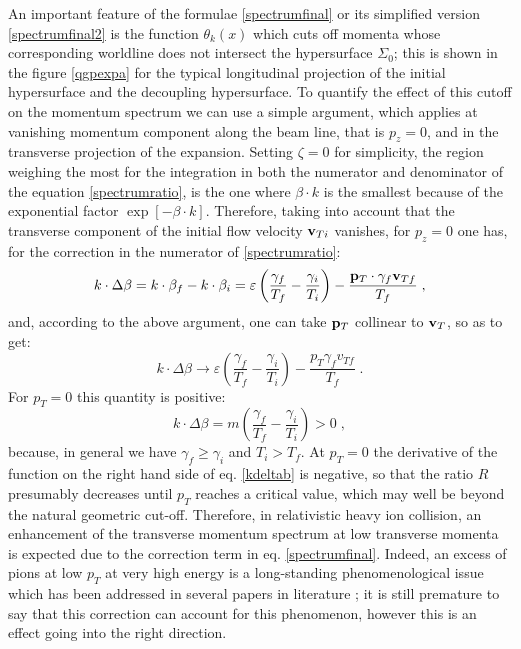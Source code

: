 \documentclass[prd,superscriptaddress,nofootinbib,notitlepage]{revtex4-1}
\newcommand{\be}{\begin{equation}}
\newcommand{\ee}{\end{equation}}
\begin{document}
An important feature of the formulae \eqref{spectrumfinal} or its simplified version \eqref{spectrumfinal2} is the function
$\theta_k(x)$ which cuts off momenta whose corresponding worldline does not intersect the hypersurface $\Sigma_0$; this is
shown in the figure \ref{qgpexpa} for the typical longitudinal projection of the initial hypersurface and the decoupling
hypersurface. To quantify the effect of this cutoff on the momentum spectrum we can use a simple argument, which applies at 
vanishing momentum component along the beam line, that is $p_z =0$, and in the transverse projection of the expansion. 
Setting $\zeta=0$ for simplicity, the region weighing the most for the integration in both the numerator and denominator of 
the equation \eqref{spectrumratio}, is the one where $\beta \cdot k$ is the smallest because of the exponential factor 
$\exp[-\beta \cdot k]$. Therefore, taking into account that the transverse component of the initial flow velocity ${\bf v}_{Ti}$ 
vanishes, for $p_z=0$ one has, for the correction in the numerator of \eqref{spectrumratio}: 
%
$$
   k \cdot \Delta \beta = k \cdot \beta_f - k \cdot \beta_i = \varepsilon \left(\frac{\gamma_f}{T_f} 
 - \frac{\gamma_i}{T_i} \right) - \frac{{\bf p}_T\cdot \gamma_f {\bf v}_{Tf}}{T_f} \;,
$$
%
and, according to the above argument, one can take ${\bf p}_T$ collinear to ${\bf v}_T$, so as to get:
%
\be\label{kdeltab}
 k \cdot \Delta \beta \longrightarrow \varepsilon \left(\frac{\gamma_f}{T_f}  - \frac{\gamma_i}{T_i} \right) - 
 \frac{p_T \gamma_f v_{Tf}}{T_f}\;.
\ee
%
For $p_T = 0$ this quantity is positive:
%
\begin{equation*}
 k \cdot \Delta \beta =  m \left(\frac{\gamma_f}{T_f}  - \frac{\gamma_i}{T_i} \right) > 0\;,
\end{equation*}
%
because, in general we have $\gamma_f \ge \gamma_i$ and $T_i > T_f$. At $p_T = 0$ the derivative of the function 
on the right hand side of eq. \eqref{kdeltab} is negative, so that the ratio $R$ presumably decreases until $p_T$
reaches a critical value, which may well be beyond the natural geometric cut-off. Therefore, in relativistic heavy ion 
collision, an enhancement of the transverse momentum spectrum at low transverse momenta is expected due to the correction 
term in eq. \eqref{spectrumfinal}. Indeed, an excess of pions at low $p_T$ \cite{ALICE:2013mez,ALICE:2019hno} at very high 
energy is a long-standing phenomenological issue which has been addressed in several papers in literature \cite{Lu:2024shm,McNelis:2021acu,Begun:2015ifa}; it is still premature to say that this correction can account for this phenomenon, 
however this is an effect going into the right direction. 
\end{document}
